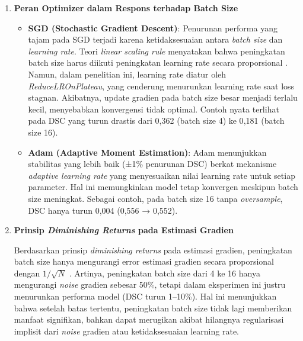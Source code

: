 \begin{enumerate}
	\item \textbf{Peran Optimizer dalam Respons terhadap Batch Size}
	\begin{itemize}
		\item \textbf{SGD (Stochastic Gradient Descent)}: Penurunan performa yang tajam pada SGD terjadi karena ketidaksesuaian antara \textit{batch size} dan \textit{learning rate}. Teori \textit{linear scaling rule} menyatakan bahwa peningkatan batch size harus diikuti peningkatan learning rate secara proporsional  \cite{goyal_accurate_2018, panda_new_2024}. Namun, dalam penelitian ini, learning rate diatur oleh \textit{ReduceLROnPlateau}, yang cenderung menurunkan learning rate saat loss stagnan. Akibatnya, update gradien pada batch size besar menjadi terlalu kecil, menyebabkan konvergensi tidak optimal. Contoh nyata terlihat pada DSC yang turun drastis dari 0{,}362 (batch size 4) ke 0{,}181 (batch size 16).
		
		\item \textbf{Adam (Adaptive Moment Estimation)}: Adam menunjukkan stabilitas yang lebih baik (±1\% penurunan DSC) berkat mekanisme \textit{adaptive learning rate} yang menyesuaikan nilai learning rate untuk setiap parameter. Hal ini memungkinkan model tetap konvergen meskipun batch size meningkat. Sebagai contoh, pada batch size 16 tanpa \textit{oversample}, DSC hanya turun 0{,}004 (0{,}556 → 0{,}552).
	\end{itemize}
	
	\item \textbf{Prinsip \textit{Diminishing Returns} pada Estimasi Gradien}
	
	Berdasarkan prinsip \textit{diminishing returns} pada estimasi gradien, peningkatan batch size hanya mengurangi error estimasi gradien secara proporsional dengan $1/\sqrt{N}$ \cite{bishop_deep_2024}. Artinya, peningkatan batch size dari 4 ke 16 hanya mengurangi \textit{noise} gradien sebesar 50\%, tetapi dalam eksperimen ini justru menurunkan performa model (DSC turun 1–10\%). Hal ini menunjukkan bahwa setelah batas tertentu, peningkatan batch size tidak lagi memberikan manfaat signifikan, bahkan dapat merugikan akibat hilangnya regularisasi implisit dari \textit{noise} gradien atau ketidaksesuaian learning rate.
\end{enumerate}



